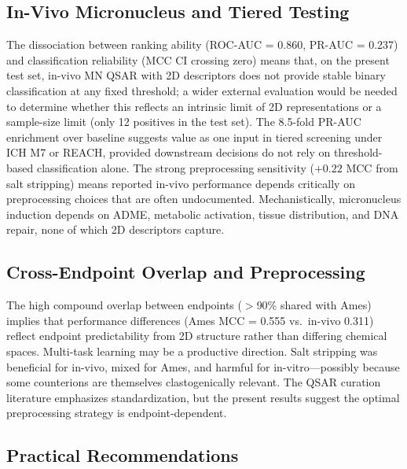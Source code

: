 \subsection{In-Vivo Micronucleus and Tiered Testing}

The dissociation between ranking ability (ROC-AUC = 0.860, PR-AUC = 0.237) and classification 
reliability (MCC CI crossing zero) means that, on the present test set, in-vivo MN QSAR with 
2D descriptors does not provide stable binary classification at any fixed threshold; a wider 
external evaluation would be needed to determine whether this reflects an intrinsic limit of 
2D representations or a sample-size limit (only 12 positives in the test set). The 8.5-fold 
PR-AUC enrichment over baseline suggests value as one input in tiered screening under ICH 
M7\cite{ICH_M7_2017} or REACH,\cite{EU_REACH_2006,Dobo_2012} provided downstream decisions 
do not rely on threshold-based classification alone. The strong preprocessing sensitivity 
($+0.22$ MCC from salt stripping) means reported in-vivo performance depends critically on 
preprocessing choices that are often undocumented.\cite{Fourches_2016} Mechanistically, 
micronucleus induction depends on ADME, metabolic activation, tissue distribution, and DNA 
repair,\cite{Tweats_2007,Kirkland_2011} none of which 2D descriptors capture.

\subsection{Cross-Endpoint Overlap and Preprocessing}

The high compound overlap between endpoints ($>$90\% shared with Ames) implies that performance differences (Ames MCC = 0.555 vs.\ in-vivo 0.311) reflect endpoint predictability from 2D structure rather than 
differing chemical spaces.\cite{Tropsha_2010} Multi-task learning may be a productive direction.\cite{Ramsundar_2015} 
Salt stripping was beneficial for in-vivo, mixed for Ames, and harmful for in-vitro---possibly because some counterions are themselves clastogenically relevant. 
The QSAR curation literature\cite{Fourches_2010,Fourches_2016} emphasizes standardization, but the present results suggest the optimal preprocessing strategy is endpoint-dependent.

\subsection{Practical Recommendations}

